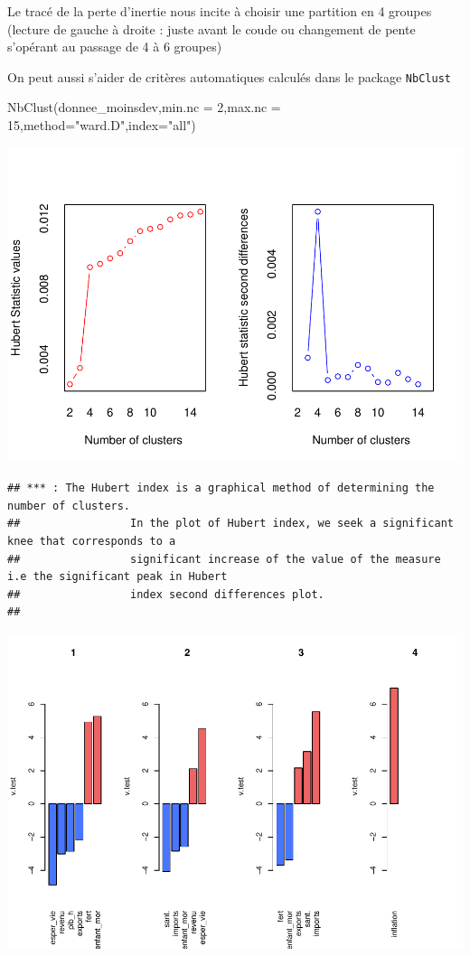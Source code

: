 \documentclass[
]{article}
\newenvironment{Shaded}{}{}
\newcommand{\AttributeTok}[1]{#1}
\newcommand{\DecValTok}[1]{#1}
\newcommand{\FunctionTok}[1]{#1}
\newcommand{\NormalTok}[1]{#1}
\newcommand{\StringTok}[1]{\textcolor[rgb]{0.00,0.50,0.50}{#1}}
\begin{document}
Le tracé de la perte d'inertie nous incite à choisir une partition en 4
groupes (lecture de gauche à droite : juste avant le coude ou changement
de pente s'opérant au passage de 4 à 6 groupes)

On peut aussi s'aider de critères automatiques calculés dans le package
\texttt{NbClust}

\begin{Shaded}
\begin{Highlighting}[]
\FunctionTok{NbClust}\NormalTok{(donnee\_moinsdev,}\AttributeTok{min.nc =} \DecValTok{2}\NormalTok{,}\AttributeTok{max.nc =} \DecValTok{15}\NormalTok{,}\AttributeTok{method=}\StringTok{"ward.D"}\NormalTok{,}\AttributeTok{index=}\StringTok{"all"}\NormalTok{)}
\end{Highlighting}
\end{Shaded}

\includegraphics{Projet_files/figure-latex/unnamed-chunk-35-1.pdf}

\begin{verbatim}
## *** : The Hubert index is a graphical method of determining the number of clusters.
##                 In the plot of Hubert index, we seek a significant knee that corresponds to a 
##                 significant increase of the value of the measure i.e the significant peak in Hubert
##                 index second differences plot. 
## 
\end{verbatim}

\includegraphics{Projet_files/figure-latex/unnamed-chunk-35-2.pdf}
\end{document}
